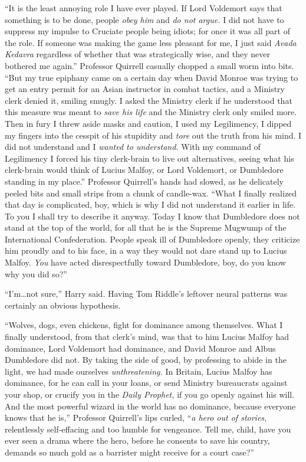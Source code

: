 “It is the least annoying role I have ever played. If Lord Voldemort says that something is to be done, people \emph{obey him} and \emph{do not argue.} I did not have to suppress my impulse to Cruciate people being idiots; for once it was all part of the role. If someone was making the game less pleasant for me, I just said \emph{Avada Kedavra} regardless of whether that was strategically wise, and they never bothered me again.” Professor Quirrell casually chopped a small worm into bits. “But my true epiphany came on a certain day when David Monroe was trying to get an entry permit for an Asian instructor in combat tactics, and a Ministry clerk denied it, smiling smugly. I asked the Ministry clerk if he understood that this measure was meant to \emph{save his life} and the Ministry clerk only smiled more. Then in fury I threw aside masks and caution, I used my Legilimency, I dipped my fingers into the cesspit of his stupidity and \emph{tore} out the truth from his mind. I did not understand and I \emph{wanted to understand.} With my command of Legilimency I forced his tiny clerk-brain to live out alternatives, seeing what his clerk-brain would think of Lucius Malfoy, or Lord Voldemort, or Dumbledore standing in my place.” Professor Quirrell’s hands had slowed, as he delicately peeled bits and small strips from a chunk of candle-wax. “What I finally realized that day is complicated, boy, which is why I did not understand it earlier in life. To you I shall try to describe it anyway. Today I know that Dumbledore does not stand at the top of the world, for all that he is the Supreme Mugwump of the International Confederation. People speak ill of Dumbledore openly, they criticize him proudly and to his face, in a way they would not dare stand up to Lucius Malfoy. \emph{You} have acted disrespectfully toward Dumbledore, boy, do you know why you did so?”

“I’m…not sure,” Harry said. Having Tom Riddle’s leftover neural patterns was certainly an obvious hypothesis.

“Wolves, dogs, even chickens, fight for dominance among themselves. What I finally understood, from that clerk’s mind, was that to him Lucius Malfoy had dominance, Lord Voldemort had dominance, and David Monroe and Albus Dumbledore did not. By taking the side of good, by professing to abide in the light, we had made ourselves \emph{unthreatening.} In Britain, Lucius Malfoy has dominance, for he can call in your loans, or send Ministry bureaucrats against your shop, or crucify you in the \emph{Daily Prophet,} if you go openly against his will. And the most powerful wizard in the world has no dominance, because everyone knows that he is,” Professor Quirrell’s lips curled, “\emph{a hero out of stories,} relentlessly self-effacing and too humble for vengeance. Tell me, child, have you ever seen a drama where the hero, before he consents to save his country, demands so much gold as a barrister might receive for a court case?”

